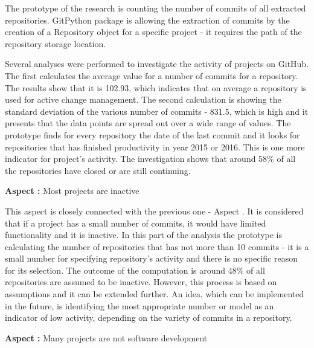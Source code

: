 The prototype of the research is counting the number of commits of all extracted repositories. GitPython package is allowing the extraction of commits by the creation of a Repository object for a specific project - it requires the path of the repository storage location. 

Several analyses were performed to investigate the activity of projects on GitHub. The first calculates the average value for a number of commits for a repository. The results show that it is 102.93, which indicates that on average a repository is used for active change management. The second calculation is showing the standard deviation\cite{stdWiki} of the various number of commits - 831.5, which is high and it presents that the data points are spread out over a wide range of values. The prototype finds for every repository the date of the last commit and it looks for repositories that has finished productivity in year 2015 or 2016. This is one more indicator for project's activity. The investigation shows that around 58\% of all the repositories have closed or are still continuing. 


\vspace{5mm}
\begin{mdframed}
\vspace{1px}
\textbf{Aspect :}  Most projects are inactive
\vspace{1px}
\end{mdframed}
\vspace{2mm}

This aspect is closely connected with the previous one - Aspect . It is considered that if a project has a small number of commits, it would have limited functionality and it is inactive. In this part of the analysis the prototype is calculating the number of repositories that has not more than 10 commits - it is a small number for specifying repository's activity and there is no specific reason for its selection. The outcome of the computation is around 48\% of all repositories are assumed to be inactive. However, this process is based on assumptions and it can be extended further. An idea, which can be implemented in the future, is identifying the most appropriate number or model as an indicator of low activity, depending on the variety of commits in a repository. 

\vspace{5mm}
\begin{mdframed}
\vspace{1px}
\textbf{Aspect :}  Many projects are not software development
\vspace{1px}
\end{mdframed}
\vspace{2mm}

